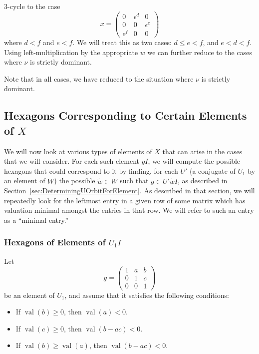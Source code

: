 \documentclass{amsart}
\theoremstyle{definition}
\def\e{\epsilon}
\def\W{\widetilde{W}}
\def\w{\widetilde{w}}
\def\val{\mathop{\mathrm{val}}}
\newenvironment{caselist}
	       {\begin{list}{\underline{Case \arabic{enumi}}:}
		   {\usecounter{enumi}
		     \setlength{\itemindent}{0.5in}
		     \setlength{\leftmargin}{0in}
		     \setlength{\rightmargin}{0in}
	       }}
	       {\end{list}}
\begin{document}
\begin{caselist}
      3-cycle to the case
      \begin{equation*}
        x = \begin{pmatrix}
          0 & \e^d & 0 \\
          0 & 0 & \e^e \\
          \e^f & 0 & 0
        \end{pmatrix}
      \end{equation*}
      where $d < f$ and $e < f$.  We will treat this as two cases: $d \le e <
      f$, and $e < d < f$.  Using left-multiplication by the appropriate $w$ we
      can further reduce to the cases where $\nu$ is strictly dominant.
  \end{caselist}

  Note that in all cases, we have reduced to the situation where $\nu$ is
  strictly dominant.


  \subsection{Hexagons Corresponding to Certain Elements of $X$}
  We will now look at various types of elements of $X$ that can arise in the
  cases that we will consider.  For each such element $gI$, we will compute the
  possible hexagons that could correspond to it by finding, for each $U'$ (a
  conjugate of $U_1$ by an element of $W$) the possible $\w \in \W$ such that
  $g \in U'\w I$, as described in
  Section~\ref{sec:DeterminingUOrbitForElement}.  As described in that section,
  we will repeatedly look for the leftmost entry in a given row of some matrix
  which has valuation minimal amongst the entries in that row.  We will refer
  to such an entry as a ``minimal entry.''

  \subsubsection{Hexagons of Elements of $U_1 I$}
  \label{sec:hexagons-u}
  Let
  \begin{equation*}
    g =
    \begin{pmatrix}
      1 & a & b \\
      0 & 1 & c \\
      0 & 0 & 1
    \end{pmatrix}
  \end{equation*}
  be an element of $U_1$, and assume that it satisfies the following
  conditions:
  \begin{itemize}
    \item If $\val(b) \ge 0$, then $\val(a) < 0$.
    \item If $\val(c) \ge 0$, then $\val(b-ac) < 0$.
    \item If $\val(b) \ge \val(a)$, then $\val(b-ac) < 0$.
  \end{itemize}
\end{document}
